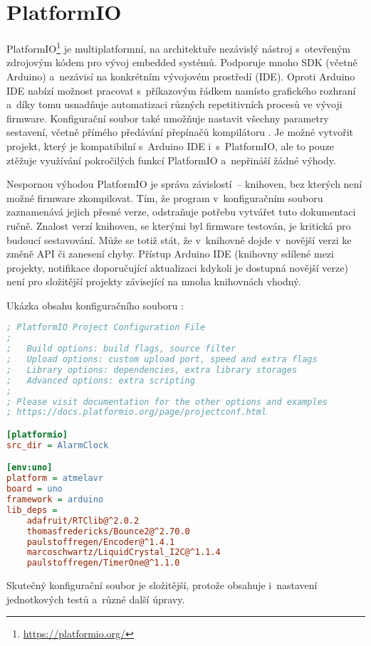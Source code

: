 \section{PlatformIO}
PlatformIO\footnote{\url{https://platformio.org/}} je multiplatformní, na
architektuře nezávislý nástroj s~otevřeným zdrojovým kódem pro vývoj embedded
systémů. Podporuje mnoho \acs{SDK} (včetně Arduino) a~nezávisí na konkrétním
vývojovém prostředí (\acs{IDE}). Oproti Arduino IDE nabízí možnost pracovat
s~příkazovým řádkem namísto grafického rozhraní a~díky tomu usnadňuje
automatizaci různých repetitivních procesů ve vývoji firmware. Konfigurační
soubor  také umožňuje nastavit všechny parametry
sestavení, včetně přímého předávání přepínačů kompilátoru .
Je možné vytvořit projekt, který je kompatibilní s~Arduino IDE i~s~PlatformIO,
ale to pouze ztěžuje využívání pokročilých funkcí PlatformIO a~nepřináší žádné
výhody.

Nespornou výhodou PlatformIO je správa závislostí~-- knihoven, bez kterých
není možné firmware zkompilovat. Tím, že program v~konfiguračním souboru
 zaznamenává jejich přesné verze, odstraňuje potřebu
vytvářet tuto dokumentaci ručně. Znalost verzí knihoven, se kterými byl
firmware testován, je kritická pro budoucí sestavování. Může se totiž stát, že
v~knihovně dojde v~novější verzi ke změně API či zanesení chyby. Přístup
Arduino IDE (knihovny sdílené mezi projekty, notifikace doporučující
aktualizaci kdykoli je dostupná novější verze) není pro složitější projekty
závisející na mnoha knihovnách vhodný.

Ukázka obsahu konfiguračního souboru :
\begin{lstlisting}[language=Ini]
; PlatformIO Project Configuration File
;
;   Build options: build flags, source filter
;   Upload options: custom upload port, speed and extra flags
;   Library options: dependencies, extra library storages
;   Advanced options: extra scripting
;
; Please visit documentation for the other options and examples
; https://docs.platformio.org/page/projectconf.html

[platformio]
src_dir = AlarmClock

[env:uno]
platform = atmelavr
board = uno
framework = arduino
lib_deps = 
	adafruit/RTClib@^2.0.2
	thomasfredericks/Bounce2@^2.70.0
	paulstoffregen/Encoder@^1.4.1
	marcoschwartz/LiquidCrystal_I2C@^1.1.4
	paulstoffregen/TimerOne@^1.1.0
\end{lstlisting}
Skutečný konfigurační soubor je složitější, protože obsahuje i~nastavení
jednotkových testů a~různé další úpravy.


